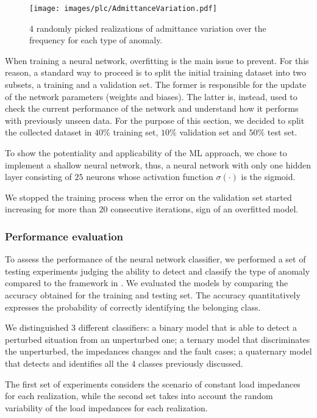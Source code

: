 \begin{figure}
	\centering
	\texttt{[image: images/plc/AdmittanceVariation.pdf]}
	\caption{4 randomly picked realizations of admittance variation over the frequency for each type of anomaly.}
	\label{fig:plc_Yin}
\end{figure}

When training a neural network, overfitting is the main issue to prevent. For this reason, a standard way to proceed is to split the initial training dataset into two subsets, a training and a validation set. The former is  responsible for the update of the network parameters (weights and biases). The latter is, instead, used to check the current performance of the network and understand how it performs with previously unseen data. For the purpose of this section, we decided to split the collected dataset in $40\%$ training set, $10\%$ validation set and $50\%$ test set.

To show the potentiality and applicability of the ML approach, we chose to implement a shallow neural network, thus, a neural network with only one hidden layer consisting of $25$ neurons whose activation function $\sigma(\cdot)$ is the sigmoid.

We stopped the training process when the error on the validation set started increasing for more than $20$ consecutive iterations, sign of an overfitted model. 

\subsubsection{Performance evaluation}
\label{subsec:plc_performance}
To assess the performance of the neural network classifier, we performed a set of testing experiments judging the ability to detect and classify the type of anomaly compared to the framework in \cite{8641473}. We evaluated the models by comparing the accuracy obtained for the training and testing set. The accuracy quantitatively expresses the probability of correctly identifying the belonging class. 

We distinguished $3$ different classifiers: a binary model that is able to detect a perturbed situation from an unperturbed one; a ternary model that discriminates the unperturbed, the impedances changes and the fault cases; a quaternary model that detects and identifies all the $4$ classes previously discussed.

The first set of experiments considers the scenario of constant load impedances for each realization, while the second set takes into account the random variability of the load impedances for each realization.

